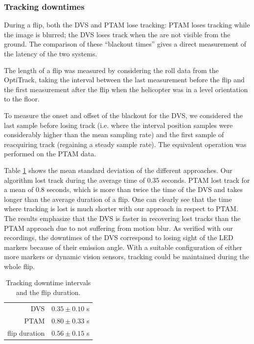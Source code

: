 \subsubsection{Tracking downtimes\label{sec:trackingspeed}}

During a flip, both the DVS and PTAM lose tracking: PTAM loses tracking
while the image is blurred; the DVS loses track when the \ALMs are
not visible from the ground. The comparison of these ``blackout times''
gives a direct measurement of the latency of the two systems. 



The length of a flip was measured by considering the roll data from
the OptiTrack, taking the interval between the last measurement before
the flip and the first measurement after the flip when the helicopter
was in a level orientation to the floor. 

To measure the onset and offset of the blackout for the DVS, we considered
the last sample before losing track (i.e. where the interval position
samples were considerably higher than the mean sampling rate) and
the first sample of reacquiring track (regaining a steady sample rate).
The equivalent operation was performed on the PTAM data. 



Table \ref{tab:downtime_tab} shows the mean standard deviation of
the different approaches. Our algorithm lost track during the average
time of 0.35 seconds. PTAM lost track for a mean of 0.8 seconds, which
is more than twice the time of the DVS and takes longer than the average
duration of a flip. One can clearly see that the time where tracking
is lost is much shorter with our approach in respect to PTAM. The
results emphasize that the DVS is faster in recovering lost tracks
than the PTAM approach due to not suffering from motion blur. As verified
with our recordings, the downtimes of the DVS correspond to losing
sight of the LED markers because of their emission angle. With a suitable
configuration of either more markers or dynamic vision sensors, tracking
could be maintained during the whole flip. 

\begin{table}
\caption{\label{tab:downtime_tab} Tracking downtime intervals and the flip
duration.}
\centering %
\begin{tabular}{r|l}
\rule{0pt}{1em}DVS  & $0.35\pm0.10$ s\tabularnewline
PTAM  & $0.80\pm0.33$ s\tabularnewline
flip duration & $0.56\pm0.15$ s\tabularnewline
\end{tabular}
\end{table}







